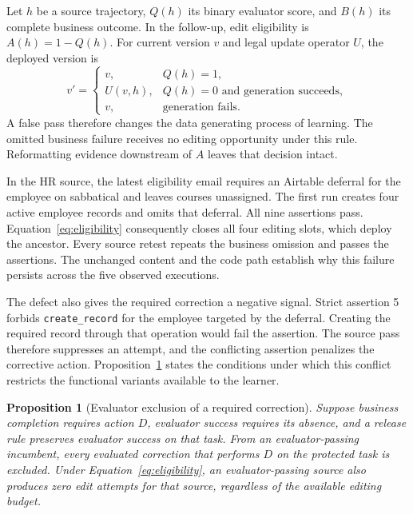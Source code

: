 \documentclass{ecai}
\newtheorem{proposition}{Proposition}
\begin{document}
Let $h$ be a source trajectory, $Q(h)$ its binary evaluator score, and $B(h)$ its complete business outcome. In the follow-up, edit eligibility is $A(h)=1-Q(h)$. For current version $v$ and legal update operator $U$, the deployed version is
\begin{equation}
v'=
\begin{cases}
v, & Q(h)=1,\\
U(v,h), & Q(h)=0\text{ and generation succeeds},\\
v, & \text{generation fails}.
\end{cases}
\label{eq:eligibility}
\end{equation}
A false pass therefore changes the data generating process of learning. The omitted business failure receives no editing opportunity under this rule. Reformatting evidence downstream of $A$ leaves that decision intact.

In the HR source, the latest eligibility email requires an Airtable deferral for the employee on sabbatical and leaves courses unassigned. The first run creates four active employee records and omits that deferral. All nine assertions pass. Equation~\eqref{eq:eligibility} consequently closes all four editing slots, which deploy the ancestor. Every source retest repeats the business omission and passes the assertions. The unchanged content and the code path establish why this failure persists across the five observed executions.

The defect also gives the required correction a negative signal. Strict assertion 5 forbids \texttt{create\_record} for the employee targeted by the deferral. Creating the required record through that operation would fail the assertion. The source pass therefore suppresses an attempt, and the conflicting assertion penalizes the corrective action. Proposition~\ref{prop:exclusion} states the conditions under which this conflict restricts the functional variants available to the learner.

\begin{proposition}[Evaluator exclusion of a required correction]
\label{prop:exclusion}
Suppose business completion requires action $D$, evaluator success requires its absence, and a release rule preserves evaluator success on that task. From an evaluator-passing incumbent, every evaluated correction that performs $D$ on the protected task is excluded. Under Equation~\eqref{eq:eligibility}, an evaluator-passing source also produces zero edit attempts for that source, regardless of the available editing budget.
\end{proposition}
\end{document}
